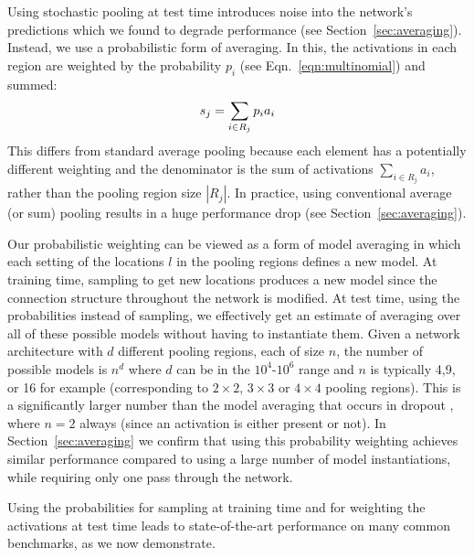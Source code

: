 \documentclass{article} %
\def\BE{\vspace{-0.0mm}\begin{equation}}
\def\EE{\vspace{-0.0mm}\end{equation}}
\newcommand{\eqn}[1]{Eqn.~\ref{eqn:#1}}
\newcommand{\secc}[1]{Section~\ref{sec:#1}}
\begin{document}
Using stochastic pooling at test time introduces noise into
the network's predictions which we found to degrade performance (see \secc{averaging}). Instead, we
use a probabilistic form of averaging. In this, the activations in
each region are weighted by the probability $p_i$ (see
\eqn{multinomial}) and summed:
\BE
s_j = \sum_{i \in R_j} p_i a_i
\EE
This differs from standard average pooling because each element has a potentially different
weighting and the denominator is the
sum of activations $\sum_{i \in R_j} a_i$, rather than the pooling
region size $|R_j|$. In practice, using conventional average (or sum) pooling
results in a huge performance drop (see \secc{averaging}).



Our probabilistic weighting can be viewed as a form of model averaging
in which each setting of the locations $l$ in the pooling regions
defines a new model. At training time, sampling to get new locations
produces a new model since the connection structure throughout the
network is modified. At test time, using the probabilities instead of
sampling, we effectively get an estimate of averaging over all of these possible
models without having to instantiate them.
Given a network architecture with $d$ different pooling
regions, each of size $n$, the number of possible models is $n^d$ where $d$ can be in
the $10^4$-$10^6$ range and $n$ is typically 4,9, or 16 for example
(corresponding to $2\times2$, $3\times3$ or $4\times4$ pooling
regions). This is a significantly larger number than the model averaging
that occurs in dropout \cite{Hinton12}, where $n=2$ always (since an activation is either present or
not).
In \secc{averaging} we confirm that using this
probability weighting achieves similar performance compared to using a large number of model
instantiations, while requiring only one pass through the network.

Using the probabilities for sampling at training time and for
weighting the activations at test time leads to state-of-the-art
performance on many common benchmarks, as we now demonstrate.
\end{document}
